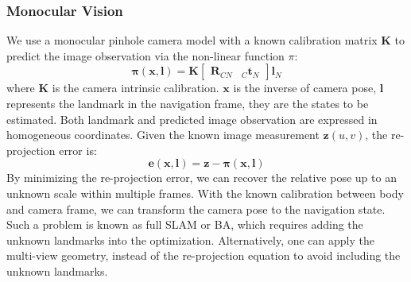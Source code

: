 \documentclass[journal,article,submit,moreauthors,pdftex]{Definitions/mdpi}
\begin{document}
\subsubsection{Monocular Vision}
We use a monocular pinhole camera model with a known calibration matrix 
$\boldsymbol{K}$ to predict the image observation via the non-linear 
function $\pi$: 
\begin{equation}
	\boldsymbol{\pi}(\boldsymbol{x,l}) = \boldsymbol{K}
	\left[\begin{matrix} \boldsymbol{R}_{CN} & _C\boldsymbol{t}_{N} \end{matrix}\right]\boldsymbol{l}_{N}
\end{equation}
where $\boldsymbol{K}$ is the camera intrinsic calibration. 
$\boldsymbol{x}$ is the inverse of camera pose, $\boldsymbol{l}$ 
represents the landmark in the navigation frame, they are the states 
to be estimated. 
Both landmark and predicted image observation are expressed in 
homogeneous coordinates. 
Given the known image measurement $\boldsymbol{z}(u,v)$, the 
re-projection error is:
\begin{equation}
	\boldsymbol{e}(\boldsymbol{x,l}) = \boldsymbol{z} - \boldsymbol{\pi}(\boldsymbol{x,l})
\end{equation}
By minimizing the re-projection error, we can recover the relative 
pose up to an unknown scale within multiple frames. 
With the known calibration between body and camera frame, we can 
transform the camera pose to the navigation state. 
Such a problem is known as full SLAM or BA, which requires adding the 
unknown landmarks into the optimization. 
Alternatively, one can apply the multi-view geometry, instead of 
the re-projection equation to avoid including the unknown 
landmarks. 
\end{document}
